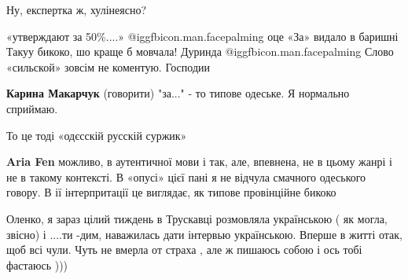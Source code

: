 \begin{itemize}
Ну, експертка ж, хулінеясно?

 

«утверждают за 50\%....» @igg{fbicon.man.facepalming}  оце «За» видало в баришні Такуу бикоко, шо
краще б мовчала! Дуринда @igg{fbicon.man.facepalming}  Слово «сильской» зовсім не коментую. Господии

\begin{itemize}
 
\textbf{Карина Макарчук} (говорити) "за..." - то типове одеське. Я нормально сприймаю.

 
То це тоді «одєсскій русскій суржик»

 
\textbf{Aria Fen} можливо, в аутентичної мови і так, але, впевнена, не в цьому жанрі і не в такому контексті. В «опусі» цієї пані я не відчула смачного одеського говору. В ії інтерпритації це виглядає, як типове провінційне бикоко
\end{itemize}

 

Оленко, я зараз цілий тиждень в Трускавці розмовляла українською ( як могла,
звісно) і ....ти -дим, наважилась дати інтервью українською. Вперше в житті
отак, щоб всі чули. Чуть не вмерла от страха , але ж пишаюсь собою і ось тобі
фастаюсь )))


\end{itemize}
